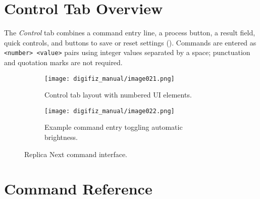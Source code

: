 \section{Control Tab Overview}

The \emph{Control} tab combines a command entry line, a process button, a result field, quick controls, and buttons to save or reset settings ().
Commands are entered as \verb|<number> <value>| pairs using integer values separated by a space; punctuation and quotation marks are not required.

\begin{figure}[htbp]
    \centering
    \begin{subfigure}{0.48\textwidth}
        \texttt{[image: digifiz\_manual/image021.png]}
        \caption{Control tab layout with numbered UI elements.}
    \end{subfigure}\hfill
    \begin{subfigure}{0.48\textwidth}
        \texttt{[image: digifiz\_manual/image022.png]}
        \caption{Example command entry toggling automatic brightness.}
    \end{subfigure}
    \caption{Replica Next command interface.}
    \label{fig:next-control-detail}
\end{figure}

\section{Command Reference}

